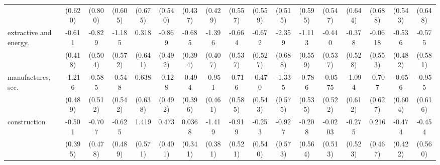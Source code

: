 {\begin{tabular}{l*{16}{c}}
                    &     (0.620)         &     (0.800)         &     (0.605)         &     (0.675)         &     (0.540)         &     (0.437)         &     (0.429)         &     (0.557)         &     (0.559)         &     (0.515)         &     (0.595)         &     (0.547)         &     (0.644)         &     (0.688)         &     (0.543)         &     (0.648)         \\
[1em]
extractive and energy.&      -0.611         &      -0.829         &      -1.185\sym{*}  &       0.318         &      -0.869         &      -0.685         &      -1.396\sym{***}&      -0.664         &      -0.672         &      -2.359\sym{***}&      -1.113\sym{*}  &      -0.440         &      -0.378         &     -0.0618         &      -0.536         &      -0.575         \\
                    &     (0.418)         &     (0.504)         &     (0.572)         &     (0.641)         &     (0.492)         &     (0.394)         &     (0.407)         &     (0.537)         &     (0.527)         &     (0.688)         &     (0.559)         &     (0.537)         &     (0.528)         &     (0.553)         &     (0.482)         &     (0.581)         \\
[1em]
manufactures, sec.  &      -1.216\sym{*}  &      -0.585         &      -0.548         &       0.638         &      -0.128         &      -0.494         &      -0.951\sym{*}  &      -0.716         &      -0.470         &      -1.335\sym{*}  &      -0.786         &     -0.0575         &      -1.094         &      -0.707         &      -0.656         &      -0.955         \\
                    &     (0.489)         &     (0.512)         &     (0.542)         &     (0.638)         &     (0.492)         &     (0.396)         &     (0.461)         &     (0.585)         &     (0.543)         &     (0.575)         &     (0.535)         &     (0.522)         &     (0.612)         &     (0.627)         &     (0.604)         &     (0.616)         \\
[1em]
construction        &      -0.501         &      -0.707         &      -0.625         &       1.419\sym{*}  &       0.473         &      0.0368         &      -1.419\sym{***}&      -0.919         &      -0.253         &      -0.927         &      -0.208         &     -0.0203         &      -0.275         &       0.216         &      -0.474         &      -0.454         \\
                    &     (0.395)         &     (0.478)         &     (0.489)         &     (0.571)         &     (0.401)         &     (0.341)         &     (0.381)         &     (0.521)         &     (0.540)         &     (0.573)         &     (0.564)         &     (0.513)         &     (0.523)         &     (0.467)         &     (0.422)         &     (0.560)         \\

\end{tabular}}
